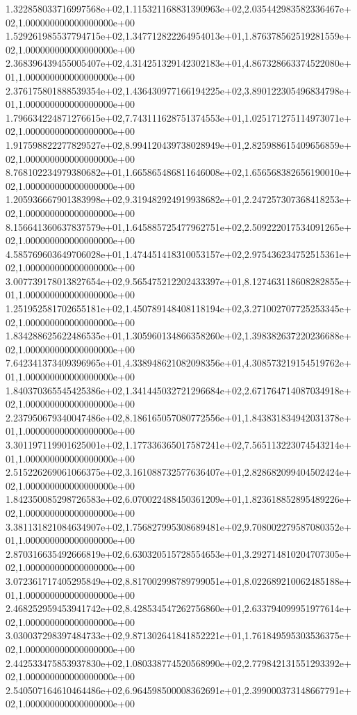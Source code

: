 1.322858033716997568e+02,1.115321168831390963e+02,2.035442983582336467e+02,1.000000000000000000e+00
1.529261985537794715e+02,1.347712822264954013e+01,1.876378562519281559e+02,1.000000000000000000e+00
2.368396439455005407e+02,4.314251329142302183e+01,4.867328663374522080e+01,1.000000000000000000e+00
2.376175801888539354e+02,1.436430977166194225e+02,3.890122305496834798e+01,1.000000000000000000e+00
1.796634224871276615e+02,7.743111628751374553e+01,1.025171275114973071e+02,1.000000000000000000e+00
1.917598822277829527e+02,8.994120439738028949e+01,2.825988615409656859e+02,1.000000000000000000e+00
8.768102234979380682e+01,1.665865486811646008e+02,1.656568382656190010e+02,1.000000000000000000e+00
1.205936667901383998e+02,9.319482924919938682e+01,2.247257307368418253e+02,1.000000000000000000e+00
8.156641360637837579e+01,1.645885725477962751e+02,2.509222017534091265e+02,1.000000000000000000e+00
4.585769603649706028e+01,1.474451418310053157e+02,2.975436234752515361e+02,1.000000000000000000e+00
3.007739178013827654e+02,9.565475212202433397e+01,8.127463118608282855e+01,1.000000000000000000e+00
1.251952581702655181e+02,1.450789148408118194e+02,3.271002707725253345e+02,1.000000000000000000e+00
1.834288625622486535e+01,1.305960134866358260e+02,1.398382637220236688e+02,1.000000000000000000e+00
7.642341373409396965e+01,4.338948621082098356e+01,4.308573219154519762e+01,1.000000000000000000e+00
1.840370365545425386e+02,1.341445032721296684e+02,2.671764714087034918e+02,1.000000000000000000e+00
2.237950679340047486e+02,8.186165057080772556e+01,1.843831834942031378e+01,1.000000000000000000e+00
3.301197119901625001e+02,1.177336365017587241e+02,7.565113223074543214e+01,1.000000000000000000e+00
2.515226269061066375e+02,3.161088732577636407e+01,2.828682099404502424e+02,1.000000000000000000e+00
1.842350085298726583e+02,6.070022488450361209e+01,1.823618852895489226e+02,1.000000000000000000e+00
3.381131821084634907e+02,1.756827995308689481e+02,9.708002279587080352e+01,1.000000000000000000e+00
2.870316635492666819e+02,6.630320515728554653e+01,3.292714810204707305e+02,1.000000000000000000e+00
3.072361717405295849e+02,8.817002998789799051e+01,8.022689210062485188e+01,1.000000000000000000e+00
2.468252959453941742e+02,8.428534547262756860e+01,2.633794099951977614e+02,1.000000000000000000e+00
3.030037298397484733e+02,9.871302641841852221e+01,1.761849595303536375e+02,1.000000000000000000e+00
2.442533475853937830e+02,1.080338774520568990e+02,2.779842131551293392e+02,1.000000000000000000e+00
2.540507164610464486e+02,6.964598500008362691e+01,2.399000373148667791e+02,1.000000000000000000e+00
